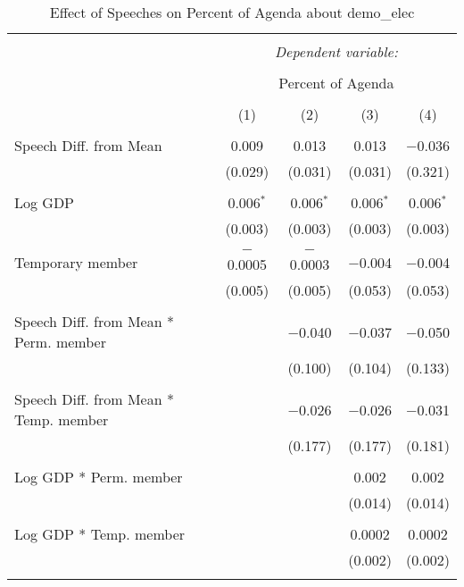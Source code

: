 
\begin{table}[!htbp] \centering 
  \caption{Effect of Speeches on Percent of Agenda about demo_elec} 
  \label{} 
\begin{tabular}{@{\extracolsep{5pt}}lcccc} 
\\[-1.8ex]\hline 
\hline \\[-1.8ex] 
 & \multicolumn{4}{c}{\textit{Dependent variable:}} \\ 
\cline{2-5} 
\\[-1.8ex] & \multicolumn{4}{c}{Percent of Agenda} \\ 
\\[-1.8ex] & (1) & (2) & (3) & (4)\\ 
\hline \\[-1.8ex] 
 Speech Diff. from Mean & 0.009 & 0.013 & 0.013 & $-$0.036 \\ 
  & (0.029) & (0.031) & (0.031) & (0.321) \\ 
  & & & & \\ 
 Log GDP & 0.006$^{*}$ & 0.006$^{*}$ & 0.006$^{*}$ & 0.006$^{*}$ \\ 
  & (0.003) & (0.003) & (0.003) & (0.003) \\ 
  & & & & \\ 
 Temporary member & $-$0.0005 & $-$0.0003 & $-$0.004 & $-$0.004 \\ 
  & (0.005) & (0.005) & (0.053) & (0.053) \\ 
  & & & & \\ 
 Speech Diff. from Mean * Perm. member &  & $-$0.040 & $-$0.037 & $-$0.050 \\ 
  &  & (0.100) & (0.104) & (0.133) \\ 
  & & & & \\ 
 Speech Diff. from Mean * Temp. member &  & $-$0.026 & $-$0.026 & $-$0.031 \\ 
  &  & (0.177) & (0.177) & (0.181) \\ 
  & & & & \\ 
 Log GDP * Perm. member &  &  & 0.002 & 0.002 \\ 
  &  &  & (0.014) & (0.014) \\ 
  & & & & \\ 
 Log GDP * Temp. member &  &  & 0.0002 & 0.0002 \\ 
  &  &  & (0.002) & (0.002) \\ 
  & & & & \\ 

\end{tabular}
\end{table}
